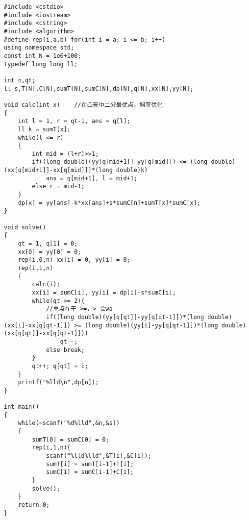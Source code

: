 \documentclass[twoside]{article}
\begin{document}
\begin{lstlisting}
#include <cstdio>
#include <iostream>
#include <cstring>
#include <algorithm>
#define rep(i,a,b) for(int i = a; i <= b; i++)
using namespace std;
const int N = 1e6+100;
typedef long long ll;
 
int n,qt;
ll s,T[N],C[N],sumT[N],sumC[N],dp[N],q[N],xx[N],yy[N];
 
void calc(int x)	//在凸壳中二分最优点，斜率优化
{
	int l = 1, r = qt-1, ans = q[l];
	ll k = sumT[x];
	while(l <= r)
	{
		int mid = (l+r)>>1;
		if((long double)(yy[q[mid+1]]-yy[q[mid]]) <= (long double)(xx[q[mid+1]]-xx[q[mid]])*(long double)k)
			ans = q[mid+1], l = mid+1;
		else r = mid-1;
	}
	dp[x] = yy[ans]-k*xx[ans]+s*sumC[n]+sumT[x]*sumC[x];
}
 
void solve()
{
	qt = 1, q[1] = 0;
	xx[0] = yy[0] = 0;
	rep(i,0,n) xx[i] = 0, yy[i] = 0;
	rep(i,1,n)
	{
		calc(i);
		xx[i] = sumC[i], yy[i] = dp[i]-s*sumC[i];
		while(qt >= 2){
			//重点在于 >=，> 会wa
			if((long double)(yy[q[qt]]-yy[q[qt-1]])*(long double)(xx[i]-xx[q[qt-1]]) >= (long double)(yy[i]-yy[q[qt-1]])*(long double)(xx[q[qt]]-xx[q[qt-1]]))
				qt--;
			else break;
		}
		qt++; q[qt] = i;
	} 
	printf("%lld\n",dp[n]);
}
 
int main()
{
	while(~scanf("%d%lld",&n,&s))
	{
		sumT[0] = sumC[0] = 0;
		rep(i,1,n){
			scanf("%lld%lld",&T[i],&C[i]);
			sumT[i] = sumT[i-1]+T[i];
			sumC[i] = sumC[i-1]+C[i];
		}
		solve();
	}
	return 0;
}\end{lstlisting}
\end{document}
